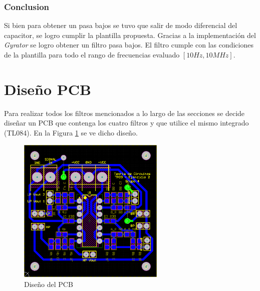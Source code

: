 \documentclass[12pt,a4paper]{article}
\begin{document}
\subsubsection{Conclusion}

Si bien para obtener un pasa bajos se tuvo que salir de modo diferencial del capacitor, se logro cumplir la plantilla propuesta. Gracias a la implementación del \textit{Gyrator} se logro obtener un filtro pasa bajos. El filtro cumple con las condiciones de la plantilla para todo el rango de frecuencias evaluado $[10Hz,10MHz]$.


\section{Diseño PCB}

Para realizar todos los filtros mencionados a lo largo de las secciones se decide diseñar un PCB que contenga los cuatro filtros y que utilice el mismo integrado (TL084). En la Figura \ref{fig:pcb} se ve dicho diseño. 

\begin{figure}[h!]                                                       
    \centering\includegraphics[width=7cm, height=7cm]{Resources/ej2_pcb.png}
    \caption{Diseño del PCB }
    \label{fig:pcb}
    \end{figure}
    
\end{document}
